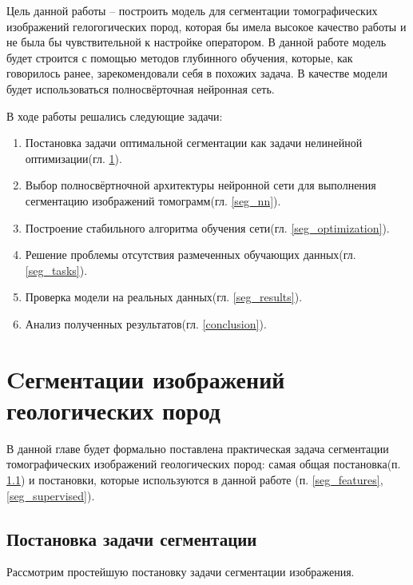 \documentclass[12pt, a4paper]{extarticle}
\begin{document}
Цель данной работы -- построить модель для сегментации томографических изображений гелогогических пород, которая бы имела высокое качество работы и не была бы чувствительной к настройке оператором. В данной работе модель будет строится с помощью методов глубинного обучения, которые, как говорилось ранее, зарекомендовали себя в похожих задача. В качестве модели будет использоваться полносвёрточная нейронная сеть.

В ходе работы решались следующие задачи:
\begin{enumerate}
	\item Постановка задачи оптимальной сегментации как задачи нелинейной оптимизации(гл. \ref{seg_all}).
	
	\item Выбор полносвёртночной архитектуры нейронной сети для  выполнения сегментацию изображений томограмм(гл. \ref{seg_nn}).

	\item Построение стабильного алгоритма обучения сети(гл. \ref{seg_optimization}).
	
	\item Решение проблемы отсутствия размеченных обучающих данных(гл. \ref{seg_tasks}).
	
	\item Проверка модели на реальных данных(гл. \ref{seg_results}).
	
	\item Анализ полученных результатов(гл. \ref{conclusion}). 
	
\end{enumerate}
  
\newpage


\section{Cегментации изображений геологических пород} \label{seg_all}

В данной главе будет формально поставлена практическая задача сегментации 
томографических изображений геологических пород: самая общая постановка(п. \ref{seg_def}) и постановки, которые используются  в данной работе (п. \ref{seg_features}, \ref{seg_supervised}).
 
\subsection{Постановка задачи сегментации} \label{seg_def}

Рассмотрим простейшую постановку задачи сегментации изображения.
\end{document}
